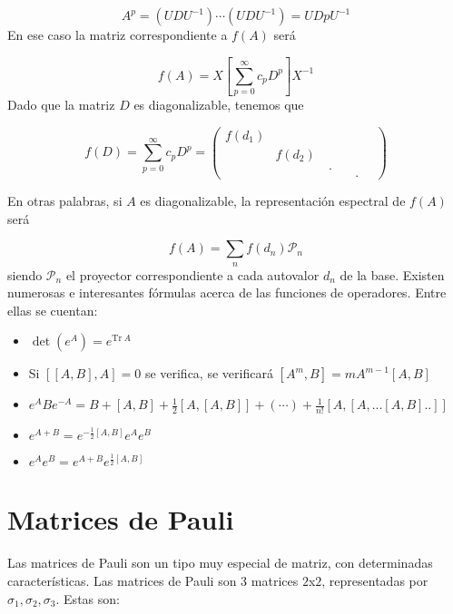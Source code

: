 \documentclass[12pt,a4paper]{book}
\numberwithin{equation}{chapter}
\numberwithin{figure}{chapter}
\newcommand{\ccorchetes}[1]{\left[ #1  \right]}
\newcommand{\Tr}{\mathrm{Tr} \ }
\begin{document}
\begin{equation}
A^p = (U D U^{-1}) \cdots (U D U^{-1}) = U Dp U^{-1}
\end{equation}
En ese caso la matriz correspondiente a $f(A)$ será

\begin{equation}
f(A) = X \ccorchetes{ \sum_{p=0}^\infty c_p D^p } X^{-1}
\end{equation}
Dado que la matriz $D$ es diagonalizable, tenemos que

\begin{equation}
f(D) = \sum_ {p = 0}^\infty c_p D^p = \begin{pmatrix}
f(d_1) & & & \\
 & f(d_2) & & \\
 & & \ . \quad & \\
 & & & . \quad 
\end{pmatrix}
\end{equation}

En otras palabras, si $A$ es diagonalizable, la representación espectral de $f(A)$ será 

\begin{equation}
f(A) = \sum_n f(d_n) \mathcal{P}_n
\end{equation}
siendo $\mathcal{P}_n$ el proyector correspondiente a cada autovalor $d_n$ de la base. Existen numerosas e interesantes fórmulas acerca de las funciones de operadores. Entre ellas se cuentan:

\begin{itemize}
\item $ \det (e^A) = e^{\Tr A} $
\item Si $[[A,B],A]=0$ se verifica, se verificará $ [A^m,B] = m A^{m-1} [A,B] $
\item $ e^{A}Be^{-A} = B+[A,B]+ \frac{1}{2} [A,[A,B]] + (\cdots) + \frac{1}{n!} [A,[A,...[A,B]..]] $
\item $e^{A+B}=e^{-\frac{1}{2}[A,B]} e^{A} e^{B}$
\item $e^A e^B = e^{A+B} e^{\frac{1}{2}[A,B]}$
\end{itemize}

\section{Matrices de Pauli}

Las matrices de Pauli son un tipo muy especial de matriz, con determinadas características. Las matrices de Pauli son 3 matrices $2$x$2$, representadas por $\sigma_1,\sigma_2,\sigma_3$. Estas son:
\end{document}
